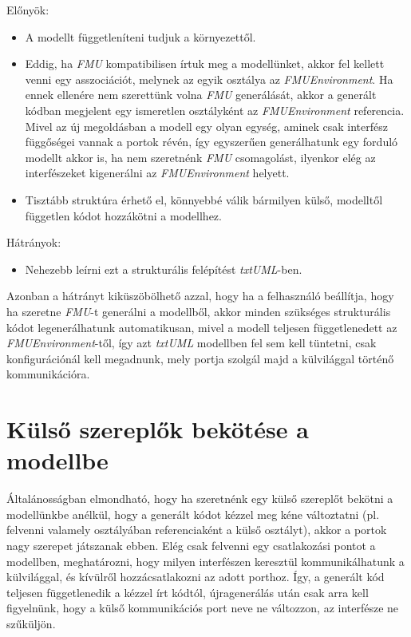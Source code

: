 \documentclass[a4paper,12pt]{report}
\begin{document}
Előnyök: \\
\begin{itemize}
\item A modellt függetleníteni tudjuk a környezettől.
\item  Eddig, ha \textit{FMU} kompatibilisen írtuk meg a modellünket, akkor fel kellett venni egy asszociációt, melynek az egyik osztálya az \textit{FMUEnvironment}. Ha ennek ellenére nem szerettünk volna \textit{FMU} generálását, akkor a generált kódban megjelent egy ismeretlen osztályként az \textit{FMUEnvironment} referencia. Mivel az új megoldásban a modell egy olyan egység, aminek csak interfész függőségei vannak a portok révén, így egyszerűen generálhatunk egy forduló modellt akkor is, ha nem szeretnénk \textit{FMU} csomagolást, ilyenkor elég az interfészeket kigenerálni az \textit{FMUEnvironment} helyett.
\item Tisztább struktúra érhető el, könnyebbé válik bármilyen külső, modelltől független kódot hozzákötni a modellhez. 
\end{itemize}
Hátrányok: \\
\begin{itemize}
\item Nehezebb leírni ezt a strukturális felépítést \textit{txtUML}-ben.
\end{itemize}
Azonban a hátrányt kiküszöbölhető azzal, hogy ha a felhasználó beállítja, hogy ha szeretne \textit{FMU}-t generálni a modellből, akkor minden szükséges strukturális kódot legenerálhatunk automatikusan, mivel a modell teljesen függetlenedett az \textit{FMUEnvironment}-től, így azt \textit{txtUML} modellben fel sem kell tüntetni, csak konfigurációnál kell megadnunk, mely portja szolgál majd a külvilággal történő kommunikációra.

\section{Külső szereplők bekötése a modellbe}
Általánosságban elmondható, hogy ha szeretnénk egy külső szereplőt bekötni a modellünkbe anélkül, hogy a generált kódot kézzel meg kéne változtatni (pl. felvenni valamely osztályában referenciaként a külső osztályt), akkor a portok nagy szerepet játszanak ebben. Elég csak felvenni egy csatlakozási pontot a modellben, meghatározni, hogy milyen interfészen keresztül kommunikálhatunk a külvilággal, és kívülről hozzácsatlakozni az adott porthoz. Így, a generált kód teljesen függetlenedik a kézzel írt kódtól, újragenerálás után csak arra kell figyelnünk, hogy a külső kommunikációs port neve ne változzon, az interfésze ne szűküljön. \\
\end{document}
